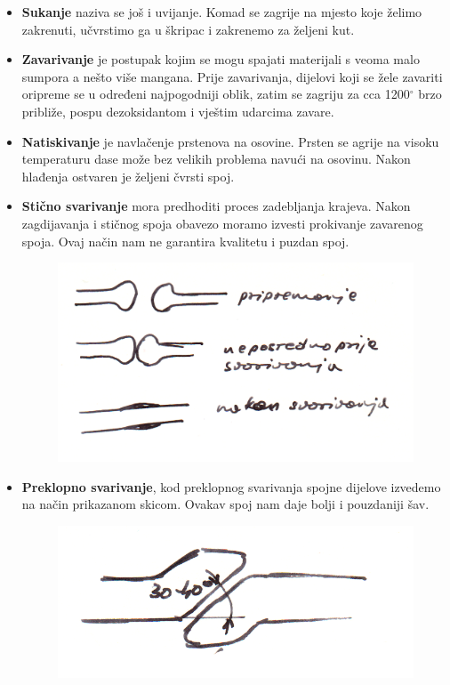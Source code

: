 \documentclass[a4paper,12pt]{article}
\numberwithin{figure}{section}
\begin{document}
\begin{itemize}
\item \textbf{Sukanje} naziva se još i uvijanje. Komad se zagrije na mjesto koje želimo zakrenuti, učvrstimo ga u škripac i zakrenemo za željeni kut.
\item \textbf{Zavarivanje} je postupak kojim se mogu spajati materijali s veoma malo sumpora a nešto više mangana. Prije zavarivanja, dijelovi koji se žele zavariti oripreme se u određeni najpogodniji oblik, zatim se zagriju za cca 1200$^{\circ}$ brzo približe, pospu dezoksidantom i vještim udarcima zavare.
\item \textbf{Natiskivanje} je navlačenje prstenova na osovine. Prsten se agrije na visoku temperaturu dase može bez velikih problema navući na osovinu. Nakon hlađenja ostvaren je željeni čvrsti spoj.
\item \textbf{Stično svarivanje} mora predhoditi proces zadebljanja krajeva. Nakon zagdijavanja  i stičnog spoja obavezo moramo izvesti prokivanje zavarenog spoja. Ovaj način nam ne garantira kvalitetu i puzdan spoj.
\begin{figure}[!h]
\centering
\includegraphics[scale=0.15]{image_43-1.png}
\end{figure}
\FloatBarrier\item \textbf{Preklopno svarivanje}, kod preklopnog svarivanja spojne dijelove izvedemo na način prikazanom skicom. Ovakav spoj nam daje bolji i pouzdaniji šav.
\begin{figure}[!h]
\centering
\includegraphics[scale=0.15]{image_43-2.png}

\end{figure}
\end{itemize}
\end{document}
